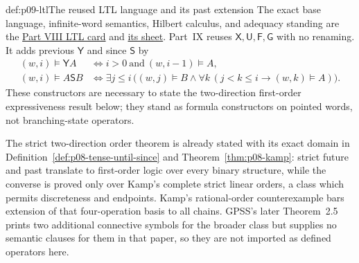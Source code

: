 \begin{hbdefinition}{def:p09-ltl}{The reused LTL language and its past extension}
The exact base language, infinite-word semantics, Hilbert calculus, and
adequacy standing are the \hyperref[entry:p08-ltl]{Part VIII LTL card} and
\hyperref[sheet:hilbert-ltl]{its sheet}.  Part~IX reuses
\(\mathsf X,\mathsf U,\mathsf F,\mathsf G\) with no renaming.  It adds previous
\(\mathsf Y\) and since \(\mathsf S\) by
\[
\begin{aligned}
 (w,i)\models\mathsf Y A
 &\Longleftrightarrow i>0\ \text{and}\ (w,i-1)\models A,\\
 (w,i)\models A\mathbin{\mathsf S}B
 &\Longleftrightarrow
 \exists j\le i\,
 \bigl((w,j)\models B\land
   \forall k\,(j<k\le i\to(w,k)\models A)\bigr).
\end{aligned}
\]
These constructors are necessary to state the two-direction first-order
expressiveness result below; they stand as formula constructors on pointed
words, not branching-state operators.
\end{hbdefinition}

The strict two-direction order theorem is already stated with its exact domain
in Definition~\ref{def:p08-tense-until-since} and
Theorem~\ref{thm:p08-kamp}: strict future and past translate to first-order
logic over every binary structure, while the converse is proved only over
Kamp's complete strict linear orders, a class which permits discreteness and
endpoints.  Kamp's rational-order counterexample bars extension of that
four-operation basis to all chains.  GPSS's later Theorem~2.5 prints two
additional connective symbols for the broader class but supplies no semantic
clauses for them in that paper, so they are not imported as defined operators
here.

